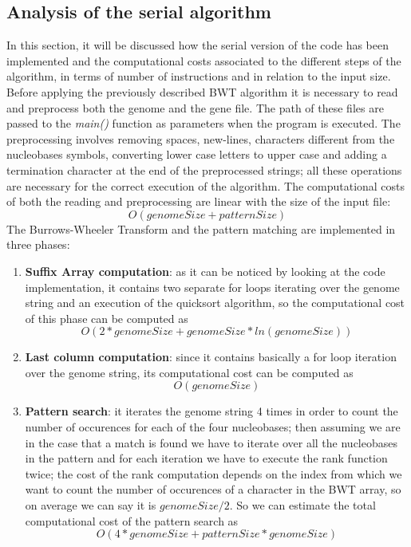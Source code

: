 \documentclass[final,5p,times,twocolumn,authoryear]{elsarticle}
\begin{document}
\subsection{Analysis of the serial algorithm}
In this section, it will be discussed how the serial version of the code has been implemented and the computational costs associated to the different steps of the algorithm, in terms of number of instructions and in relation to the input size. \\
Before applying the previously described BWT algorithm it is necessary to read and preprocess both the genome and the gene file. The path of these files are passed to the \emph{main()} function as parameters when the program is executed. The preprocessing involves removing spaces, new-lines, characters different from the nucleobases symbols, converting lower case letters to upper case and adding a termination character at the end of the preprocessed strings; all these operations are necessary for the correct execution of the algorithm. The computational costs of both the reading and preprocessing are linear with the size of the input file: 
$$ O(genomeSize + patternSize) $$
The Burrows-Wheeler Transform and the pattern matching are implemented in three phases: \\
\begin{enumerate}
    \item \textbf{Suffix Array computation}: as it can be noticed by looking at the code implementation, it contains two separate for loops iterating over the genome string and an execution of the quicksort algorithm, so the computational cost of this phase can be computed as $$O(2*genomeSize + genomeSize*ln(genomeSize))$$
    \item \textbf{Last column computation}: since it contains basically a for loop iteration over the genome string, its computational cost can be computed as $$O(genomeSize)$$
    \item \textbf{Pattern search}: it iterates the genome string 4 times in order to count the number of occurences for each of the four nucleobases; then assuming we are in the case that a match is found we have to iterate over all the nucleobases in the pattern and for each iteration we have to execute the rank function twice; the cost of the rank computation depends on the index from which we want to count the number of occurences of a character in the BWT array, so on average we can say it is $genomeSize/2$. So we can estimate the total computational cost of the pattern search as
    $$O(4*genomeSize + patternSize*genomeSize)$$
\end{enumerate}
\end{document}
